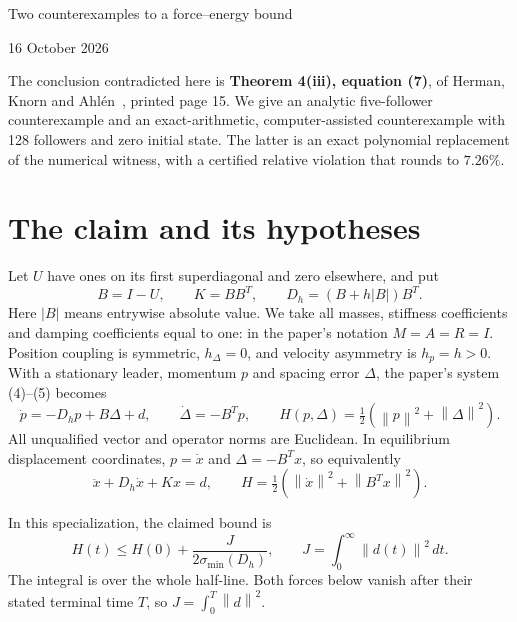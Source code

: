 \documentclass[11pt,letterpaper]{article}
\newcommand{\norm}[1]{\left\lVert#1\right\rVert}
\newcommand{\sig}{\sigma_{\min}}
\begin{document}
\begin{center}
{\LARGE Two counterexamples to a force--energy bound\par}
\vspace{5pt}
16 October 2026
\end{center}

The conclusion contradicted here is \textbf{Theorem 4(iii), equation (7)},
of Herman, Knorn and Ahl\'en~\cite{HKA}, printed page 15. We give an analytic
five-follower counterexample and an exact-arithmetic, computer-assisted
counterexample with 128 followers and zero initial state. The latter is an
exact polynomial replacement of the numerical witness, with a certified
relative violation that rounds to $7.26\%$.

\section{The claim and its hypotheses}

Let $U$ have ones on its first superdiagonal and zero elsewhere, and put
\[
 B=I-U,\qquad K=BB^T,\qquad
 D_h=(B+h|B|)B^T.
\]
Here $|B|$ means entrywise absolute value. We take all masses, stiffness
coefficients and damping coefficients equal to one: in the paper's notation
$M=A=R=I$. Position coupling is symmetric, $h_\Delta=0$, and velocity
asymmetry is $h_p=h>0$. With a stationary leader, momentum $p$ and spacing
error $\Delta$, the paper's system (4)--(5) becomes
\begin{equation}\label{eq:system}
 \dot p=-D_hp+B\Delta+d,\qquad \dot\Delta=-B^Tp,
 \qquad H(p,\Delta)=\tfrac12(\norm p^2+\norm\Delta^2).
\end{equation}
All unqualified vector and operator norms are Euclidean. In equilibrium
displacement coordinates, $p=\dot x$ and $\Delta=-B^Tx$, so equivalently
\begin{equation}\label{eq:position}
 \ddot x+D_h\dot x+Kx=d,\qquad
 H=\tfrac12(\norm{\dot x}^2+\norm{B^Tx}^2).
\end{equation}

In this specialization, the claimed bound is
\begin{equation}\label{eq:claim}
 H(t)\leq H(0)+\frac{J}{2\sig(D_h)},\qquad
 J=\int_0^\infty\norm{d(t)}^2\,dt.
\end{equation}
The integral is over the whole half-line. Both forces below vanish after their
stated terminal time $T$, so $J=\int_0^T\norm d^2$.
\end{document}
